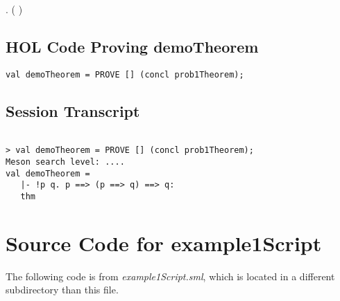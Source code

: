 \documentclass{report}
\begin{document}
\HOLTokenTurnstile{} \HOLSymConst{\HOLTokenForall{}} .  \HOLSymConst{\HOLTokenImp{}} ( \HOLSymConst{\HOLTokenImp{}} ) \HOLSymConst{\HOLTokenImp{}} 


\section{HOL Code Proving demoTheorem}
\label{sec:hol-code-proving-1}

\begin{lstlisting}[frame=trBL]
val demoTheorem = PROVE [] (concl prob1Theorem);  
\end{lstlisting}

\section{Session Transcript}
\label{sec:session-transcript-1}

\begin{session}
  \begin{scriptsize}
\begin{verbatim}

> val demoTheorem = PROVE [] (concl prob1Theorem);
Meson search level: ....
val demoTheorem =
   |- !p q. p ==> (p ==> q) ==> q:
   thm
\end{verbatim}
  \end{scriptsize}
\end{session}


\appendix{} 


\renewcommand{\thechapter}{\Alph{chapter}} 

\chapter{Source Code for example1Script}
\label{cha:source-code-sample}

The following code is from \emph{example1Script.sml}, which is located
in a different subdirectory than this file.

\end{document}
